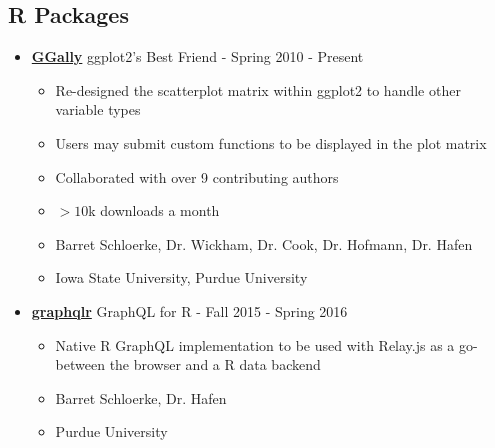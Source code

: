 \documentclass[oneside]{article}
\begin{document}
    \subsection{R Packages}
    \begin{itemize}

      \item{\bf \href{http://ggobi.github.io/ggally/}{GGally}} ggplot2's Best Friend - Spring 2010 - Present
        \begin{itemize}
          \item Re-designed the scatterplot matrix within ggplot2 to handle other variable types
          \item Users may submit custom functions to be displayed in the plot matrix
          \item Collaborated with over 9 contributing authors
          \item $> 10$k downloads a month
          \item Barret Schloerke, Dr. Wickham, Dr. Cook, Dr. Hofmann, Dr. Hafen
          \item Iowa State University, Purdue University
        \end{itemize}

      \item{\bf \href{https://github.com/schloerke/graphqlr}{graphqlr}} GraphQL for R - Fall 2015 - Spring 2016
        \begin{itemize}
          \item Native R GraphQL implementation to be used with Relay.js as a go-between the browser and a R data backend
          \item Barret Schloerke, Dr. Hafen
          \item Purdue University
        \end{itemize}


\end{itemize}
\end{document}

